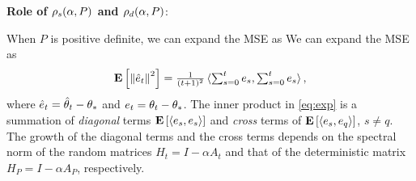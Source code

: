 \textbf{Role of $\rho_s(\alpha,P)$ and $\rho_d(\alpha,P)$}: 
\begin{comment}
The core part of the proof involves analyzing what we call the error dynamics. Define $e_t\eqdef\theta_t-\ts$, then we have
\begin{align}\label{eq:errmain}
\begin{split}
\theta_t&=\theta_{t-1}+\alpha\big(b_t-A_t\theta_{t-1}\big)\\
\theta_t-\ts&=\theta_{t-1}-\ts+\alpha\big(b_t-A_t(\theta_{t-1}-\ts+\ts)\big), \\
e_t&=(I-\alpha A_t)e_{t-1}+\alpha(b_t -b -(A_t-A)\ts)\\
e_t&=(I-\alpha A_t)e_{t-1}+\alpha\zeta_t,
\end{split}
\end{align}
where $\zeta_t\eqdef(b_t -b -(A_t-A)\ts)$. A way to look at \eqref{eq:errmain} it that at each time $t$, the error $e_t$ is multiplied by the random matrix $(I-\alpha A_t)$ and is added by a zero mean noise. Intuitively speaking, the noise part is taken care of by the PR average, and what remains to be investigated is behaviour of the random matrix. In fact, the recursion \eqref{eq:errmain} can be unfurled as below
\begin{align}\label{eq:unfold}
e_t
& = (I-\alpha A_t) (I-\alpha A_{t-1}) e_{t-2}\\ &+ \alpha (I-\alpha A_t) \zeta_{t-1} +\alpha \zeta_t \\
& \quad \vdots\\
& = (I-\alpha A_t) \cdots (I-\alpha A_1) e_0\\ &+ \alpha (I-\alpha A_t) \cdots (I-\alpha A_2) \zeta_1 \\
& + \alpha (I-\alpha A_t) \cdots (I-\alpha A_3) \zeta_2\\
&  \quad \vdots \\
&+ \alpha \zeta_t\,,
\end{align}
\end{comment}
When $P$ is positive definite, we can expand the MSE as 
We can expand the MSE as 
\begin{align}
\label{eq:exp}
	\mathbf{E}\left[\left\| \hat{e}_t\right\|^2\right]=\tfrac{1}{(t+1)^2}\, \langle \textstyle\sum_{s=0}^t e_s,\textstyle\sum_{s=0}^t e_s\rangle\,,
\end{align} 
where $\hat{e}_t = \hat{\theta}_t-\theta_*$ and $e_t = \theta_t-\theta_*$.
The inner product in \eqref{eq:exp} is a summation of \emph{diagonal} terms $\mathbf{E}\left[\langle e_s,e_s\rangle\right]$ and \emph{cross} terms of $\mathbf{E}\left[\langle e_s,e_q\rangle\right]$, $s\neq q$. The growth of the diagonal terms and the cross terms depends on the spectral norm of the random matrices $H_t=I-\alpha A_t$ and that of the deterministic matrix $H_P=I-\alpha A_P$, respectively. %
